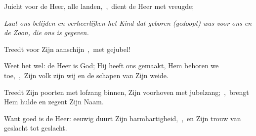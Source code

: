 \documentclass[12pt,twoside,a5paper]{article}
\begin{document}
\begin{halfparskip}
  Juicht voor de Heer, alle landen,~\sep\ dient de Heer met vreugde;


  \liturgicallbracket{} \emph{Laat ons belijden en verheerlijken het Kind dat geboren (gedoopt) was voor ons en de Zoon, die ons is gegeven.}\liturgicalrbracket

  Treedt voor Zijn aanschijn~\sep\ met gejubel!

  Weet het wel: de Heer is God; Hij heeft ons gemaakt, Hem behoren we toe,~\sep\ Zijn volk zijn wij en de schapen van Zijn weide.

  Treedt Zijn poorten met lofzang binnen, Zijn voorhoven met jubelzang;~\sep\ brengt Hem hulde en zegent Zijn Naam.

  Want goed is de Heer: eeuwig duurt Zijn barmhartigheid,~\sep\ en Zijn trouw van geslacht tot geslacht.
\end{halfparskip}

\end{document}
